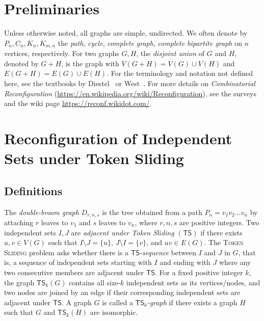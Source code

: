\documentclass[a4paper]{article}
\theoremstyle{definition}
\theoremstyle{remark}
\numberwithin{equation}{section}
\begin{document}
\tableofcontents

\section{Preliminaries}

Unless otherwise noted, all graphs are simple, undirected.
We often denote by $P_n, C_n, K_n, K_{m,n}$ the \textit{path}, \textit{cycle}, \textit{complete graph}, \textit{complete bipartite graph} on $n$ vertices, respectively.
For two graphs $G, H$, the \textit{disjoint union} of $G$ and $H$, denoted by $G + H$, is the graph with $V(G+H) = V(G) \cup V(H)$ and $E(G+H) = E(G) \cup E(H)$.
For the terminology and notation not defined here, see the textbooks by Diestel~\cite{Diestel2017} or West~\cite{West2001}. 
For more details on \textit{Combinatorial Reconfiguration} (\url{https://en.wikipedia.org/wiki/Reconfiguration}), see the surveys~\cite{books/cu/p/Heuvel13,journals/algorithms/Nishimura18,conf/seiccgtc/MynhardtN19,journals/corr/BousquetMNS22} and the wiki page \url{https://reconf.wikidot.com/}.

\section{Reconfiguration of Independent Sets under Token Sliding}

\subsection{Definitions}

The \textit{double-broom graph} $D_{r,n,s}$ is the tree obtained from a path $P_n = v_1v_2\dots v_n$ by attaching $r$ leaves to $v_1$ and $s$ leaves to $v_n$, where $r, n, s$ are positive integers. 
Two independent sets $I, J$ are \textit{adjacent under Token Sliding $(\mathsf{TS})$} if there exists $u, v \in V(G)$ such that $I \setminus J = \{u\}$, $J \setminus I = \{v\}$, and $uv \in E(G)$.
The \textsc{Token Sliding} problem asks whether there is a \textit{$\mathsf{TS}$-sequence} between $I$ and $J$ in $G$, that is, a sequence of independent sets starting with $I$ and ending with $J$ where any two consecutive members are adjacent under $\mathsf{TS}$.
For a fixed positive integer $k$, the graph $\mathsf{TS}_k(G)$ contains all size-$k$ independent sets as its vertices/nodes, and two nodes are joined by an edge if their corresponding independent sets are adjacent under $\mathsf{TS}$.
A graph $G$ is called a \textit{$\mathsf{TS}_k$-graph} if there exists a graph $H$ such that $G$ and $\mathsf{TS}_k(H)$ are isomorphic.
\end{document}
